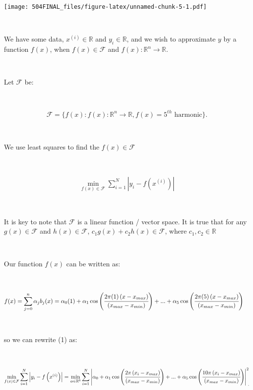 \documentclass[]{article}
\begin{document}
\texttt{[image: 504FINAL\_files/figure-latex/unnamed-chunk-5-1.pdf]}

~

We have some data, \(x^{(i)} \in \mathbb{R}\) and
\(y_i \in \mathbb{R}\), and we wish to approximate \(y\) by a function
\(f(x)\), when \(f(x) \in \mathcal{F}\) and
\(f(x): \mathbb{R}^n \rightarrow \mathbb{R}\).

~

Let \(\mathcal{F}\) be:

~

\begin{equation*} 
\mathcal{F} = \{ f(x): f(x): \mathbb{R}^n \rightarrow \mathbb{R}, f(x) = 5^{th} \text{ harmonic} \} . 
\end{equation*}

~

We use least squares to find the \(f(x) \in \mathcal{F}\)

~

\begin{align}
     \min\limits_{f(x) \in \mathcal{F} } \sum\limits_{i=1}^N \left| y_i - f\left(x^{(i)} \right) \right|
\end{align}

~

It is key to note that \(\mathcal{F}\) is a linear function / vector
space. It is true that for any \(g(x) \in \mathcal{F}\) and
\(h(x) \in \mathcal{F}\), \(c_1 g(x) + c_2 h(x) \in \mathcal{F}\), where
\(c_1,c_2 \in \mathbb{R}\)

~

Our function \(f(x)\) can be written as:

~

\begin{align*} f(x) &= \sum_{j=0}^n \alpha_j b_j(x) = \alpha_0 (1) + \alpha_1 \cos\left(
    \cfrac{2\pi(1)\left(x-x_{max}\right)}{\left(x_{max}-x_{min}\right)} \right) + ...  + \alpha_5 \cos\left(
    \cfrac{2\pi(5)\left(x-x_{max}\right)}{\left(x_{max}-x_{min}\right)} \right) 
    \end{align*}

~

so we can rewrite (1) as:

~

\hspace{-1 cm}

\begin{align}
     \min\limits_{f(x) \in \mathcal{F} } \sum\limits_{i=1}^N \left| y_i - f\left(x^{(i)} \right) \right| =
     \min\limits_{\alpha \in \mathbb{R}^6 } \sum\limits_{i=1}^N \left|\alpha_0 + \alpha_1 \cos\left(
    \cfrac{2\pi\left(x_i-x_{max}\right)}{\left(x_{max}-x_{min}\right)} \right) + ...  + \alpha_5 \cos\left(
    \cfrac{10\pi\left(x_i-x_{max}\right)}{\left(x_{max}-x_{min}\right)} \right)  \right|^2_{\text{ .} }
\end{align}
\end{document}
